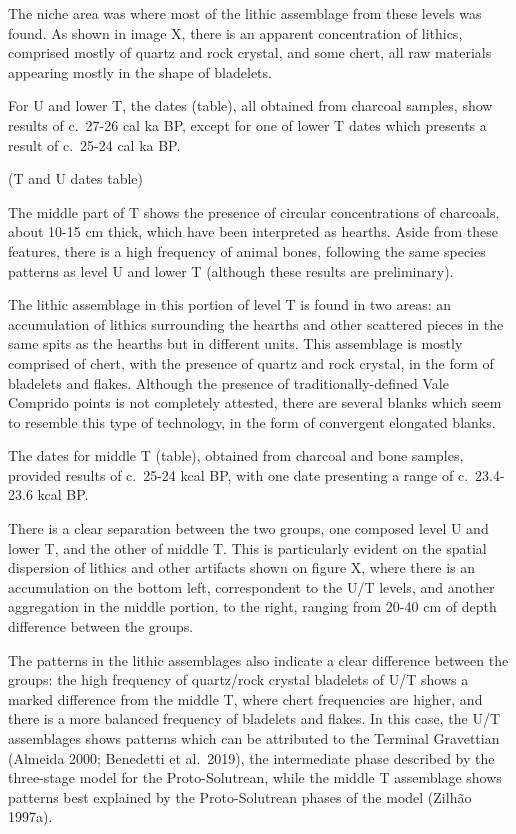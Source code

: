 \documentclass[12pt,twoside]{reedthesis}
\begin{document}
The niche area was where most of the lithic assemblage from these levels was found. As shown in image X, there is an apparent concentration of lithics, comprised mostly of quartz and rock crystal, and some chert, all raw materials appearing mostly in the shape of bladelets.

For U and lower T, the dates (table), all obtained from charcoal samples, show results of c.~27-26 cal ka BP, except for one of lower T dates which presents a result of c.~25-24 cal ka BP.

(T and U dates table)

The middle part of T shows the presence of circular concentrations of charcoals, about 10-15 cm thick, which have been interpreted as hearths. Aside from these features, there is a high frequency of animal bones, following the same species patterns as level U and lower T (although these results are preliminary).

The lithic assemblage in this portion of level T is found in two areas: an accumulation of lithics surrounding the hearths and other scattered pieces in the same spits as the hearths but in different units. This assemblage is mostly comprised of chert, with the presence of quartz and rock crystal, in the form of bladelets and flakes. Although the presence of traditionally-defined Vale Comprido points is not completely attested, there are several blanks which seem to resemble this type of technology, in the form of convergent elongated blanks.

The dates for middle T (table), obtained from charcoal and bone samples, provided results of c.~25-24 kcal BP, with one date presenting a range of c.~23.4-23.6 kcal BP.

There is a clear separation between the two groups, one composed level U and lower T, and the other of middle T. This is particularly evident on the spatial dispersion of lithics and other artifacts shown on figure X, where there is an accumulation on the bottom left, correspondent to the U/T levels, and another aggregation in the middle portion, to the right, ranging from 20-40 cm of depth difference between the groups.

The patterns in the lithic assemblages also indicate a clear difference between the groups: the high frequency of quartz/rock crystal bladelets of U/T shows a marked difference from the middle T, where chert frequencies are higher, and there is a more balanced frequency of bladelets and flakes. In this case, the U/T assemblages shows patterns which can be attributed to the Terminal Gravettian (Almeida 2000; Benedetti et al.~2019), the intermediate phase described by the three-stage model for the Proto-Solutrean, while the middle T assemblage shows patterns best explained by the Proto-Solutrean phases of the model (Zilhão 1997a).
\end{document}
